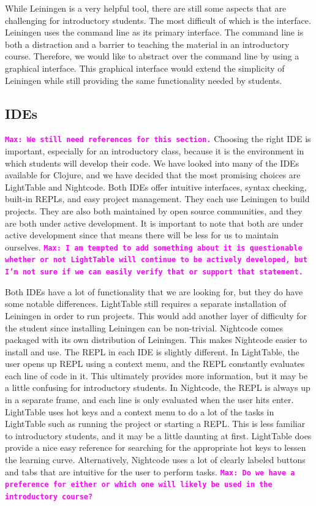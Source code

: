 \documentclass[12pt]{article}
\newcommand{\comment}[1]{{\bf \tt  {#1}}}
\newcommand{\mmcomment}[1]{\textcolor{magenta}{\comment{Max: {#1}}}}
\begin{document}
While Leiningen is a very helpful tool, there are still some aspects that are challenging for introductory students. The most difficult of which is the interface. Leiningen uses the command line as its primary interface. The command line is both a distraction and a barrier to teaching the material in an introductory course. Therefore, we would like to abstract over the command line by using a graphical interface. This graphical interface would extend the simplicity of Leiningen while still providing the same functionality needed by students.

\subsection{IDEs}
\mmcomment{We still need references for this section.}
Choosing the right IDE is important, especially for an introductory class, because it is the environment in which students will develop their code. We have looked into many of the IDEs available for Clojure, and we have decided that the most promising choices are LightTable and Nightcode. Both IDEs offer intuitive interfaces, syntax checking, built-in REPLs, and easy project management. They each use Leiningen to build projects. They are also both maintained by open source communities, and they are both under active development. It is important to note that both are under active development since that means there will be less for us to maintain ourselves. \mmcomment{I am tempted to add something about it is questionable whether or not LightTable will continue to be actively developed, but I'm not sure if we can easily verify that or support that statement.}

Both IDEs have a lot of functionality that we are looking for, but they do have some notable differences. LightTable still requires a separate installation of Leiningen in order to run projects. This would add another layer of difficulty for the student since installing Leiningen can be non-trivial. Nightcode comes packaged with its own distribution of Leiningen. This makes Nightcode easier to install and use. The REPL in each IDE is slightly different. In LightTable, the user opens up REPL using a context menu, and the REPL constantly evaluates each line of code in it. This ultimately provides more information, but it may be a little confusing for introductory students. In Nightcode, the REPL is always up in a separate frame, and each line is only evaluated when the user hits enter. LightTable uses hot keys and a context menu to do a lot of the tasks in LightTable such as running the project or starting a REPL. This is less familiar to introductory students, and it may be a little daunting at first. LightTable does provide a nice easy reference for searching for the appropriate hot keys to lessen the learning curve. Alternatively, Nightcode uses a lot of clearly labeled buttons and tabs that are intuitive for the user to perform tasks. \mmcomment{Do we have a preference for either or which one will likely be used in the introductory course?} 
\end{document}
